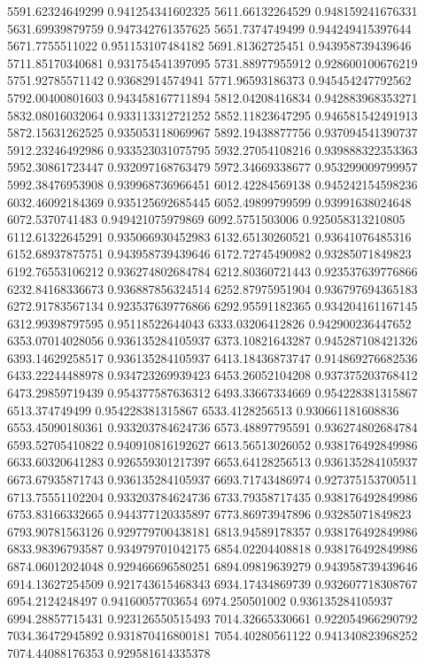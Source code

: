{5591.62324649299 0.941254341602325
5611.66132264529 0.948159241676331
5631.69939879759 0.947342761357625
5651.7374749499 0.944249415397644
5671.7755511022 0.951153107484182
5691.81362725451 0.943958739439646
5711.85170340681 0.931754541397095
5731.88977955912 0.928600100676219
5751.92785571142 0.93682914574941
5771.96593186373 0.945454247792562
5792.00400801603 0.943458167711894
5812.04208416834 0.942883968353271
5832.08016032064 0.933113312721252
5852.11823647295 0.946581542491913
5872.15631262525 0.935053118069967
5892.19438877756 0.937094541390737
5912.23246492986 0.933523031075795
5932.27054108216 0.939888322353363
5952.30861723447 0.932097168763479
5972.34669338677 0.953299009799957
5992.38476953908 0.939968736966451
6012.42284569138 0.945242154598236
6032.46092184369 0.935125692685445
6052.49899799599 0.93991638024648
6072.5370741483 0.949421075979869
6092.5751503006 0.925058313210805
6112.61322645291 0.935066930452983
6132.65130260521 0.93641076485316
6152.68937875751 0.943958739439646
6172.72745490982 0.93285071849823
6192.76553106212 0.936274802684784
6212.80360721443 0.923537639776866
6232.84168336673 0.936887856324514
6252.87975951904 0.936797694365183
6272.91783567134 0.923537639776866
6292.95591182365 0.934204161167145
6312.99398797595 0.95118522644043
6333.03206412826 0.942900236447652
6353.07014028056 0.936135284105937
6373.10821643287 0.945287108421326
6393.14629258517 0.936135284105937
6413.18436873747 0.914869276682536
6433.22244488978 0.934723269939423
6453.26052104208 0.937375203768412
6473.29859719439 0.954377587636312
6493.33667334669 0.954228381315867
6513.374749499 0.954228381315867
6533.4128256513 0.930661181608836
6553.45090180361 0.933203784624736
6573.48897795591 0.936274802684784
6593.52705410822 0.940910816192627
6613.56513026052 0.938176492849986
6633.60320641283 0.926559301217397
6653.64128256513 0.936135284105937
6673.67935871743 0.936135284105937
6693.71743486974 0.927375153700511
6713.75551102204 0.933203784624736
6733.79358717435 0.938176492849986
6753.83166332665 0.944377120335897
6773.86973947896 0.93285071849823
6793.90781563126 0.929779700438181
6813.94589178357 0.938176492849986
6833.98396793587 0.934979701042175
6854.02204408818 0.938176492849986
6874.06012024048 0.929466696580251
6894.09819639279 0.943958739439646
6914.13627254509 0.921743615468343
6934.17434869739 0.932607718308767
6954.2124248497 0.94160057703654
6974.250501002 0.936135284105937
6994.28857715431 0.923126550515493
7014.32665330661 0.922054966290792
7034.36472945892 0.931870416800181
7054.40280561122 0.941340823968252
7074.44088176353 0.929581614335378
}
